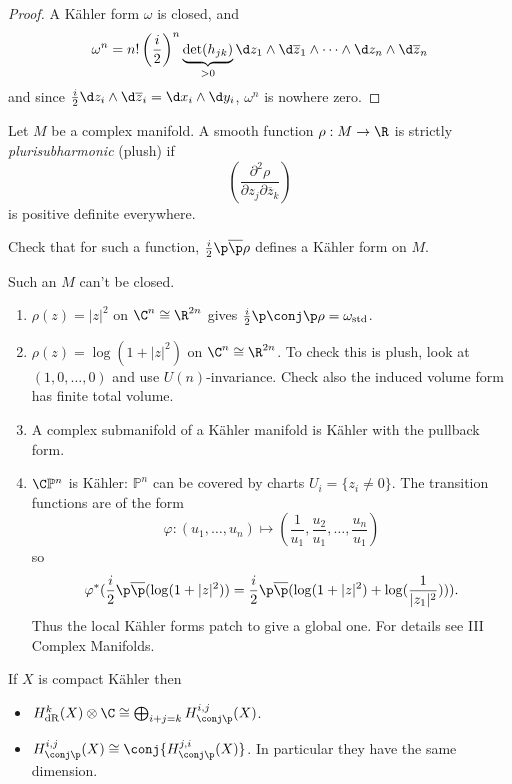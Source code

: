 \documentclass[a4paper]{article}
\renewcommand*{\P}{\mathbb{P}}
\newcommand{\w}{\wedge} %
\begin{document}
\begin{proof}
  A Kähler form \(\omega\) is closed, and
  \[
    \omega^n = n! \left(\frac{i}{2} \right)^n \underbrace{\det(h_{jk})}_{> 0} \d z_1 \w \d \overline z_1 \w \cdots \w \d z_n \w \d \overline z_n
  \]
  and since \(\frac{i}{2} \d z_i \w \d \overline z_i = \d x_i \w \d y_i\), \(\omega^n\) is nowhere zero.
\end{proof}

\begin{definition}[plurisubharmonic]
  Let \(M\) be a complex manifold. A smooth function \(\rho: M \to \R\) is strictly \emph{plurisubharmonic} (plush) if
  \[
    \left( \frac{\partial^2 \rho}{\partial z_j \partial \overline z_k} \right)
  \]
  is positive definite everywhere.
\end{definition}

Check that for such a function, \(\frac{i}{2} \p \overline \p \rho\) defines a Kähler form on \(M\).

\begin{remark}
  Such an \(M\) can't be closed.
\end{remark}

\begin{eg}\leavevmode
  \begin{enumerate}
  \item \(\rho(z) = |z|^2\) on \(\C^n \cong \R^{2n}\) gives \(\frac{i}{2} \p \conj \p \rho = \omega_{\text{std}}\).
  \item \(\rho(z) = \log(1 + |z|^2)\) on \(\C^n \cong \R^{2n}\). To check this is plush, look at \((1, 0, \dots, 0)\) and use \(U(n)\)-invariance. Check also the induced volume form has finite total volume.
  \item A complex submanifold of a Kähler manifold is Kähler with the pullback form.
  \item \(\C \P^n\) is Kähler: \(\P^n\) can be covered by charts \(U_i = \{z_i \ne 0\}\). The transition functions are of the form
    \[
      \varphi: (u_1, \dots, u_n) \mapsto (\frac{1}{u_1}, \frac{u_2}{u_1}, \dots, \frac{u_n}{u_1})
    \]
    so
    \[
      \varphi^*(\frac{i}{2} \p \overline \p(\log(1 + |z|^2))
      = \frac{i}{2} \p \overline \p (\log(1 + |z|^2) + \log (\frac{1}{|z_1|^2}))).
    \]
    Thus the local Kähler forms patch to give a global one. For details see III Complex Manifolds.
  \end{enumerate}
\end{eg}

\begin{theorem}[Hodge]
  If \(X\) is compact Kähler then
  \begin{itemize}
  \item \(H^k_{\mathrm{dR}}(X) \otimes \C \cong \bigoplus_{i + j = k} H^{i, j}_{\conj \p}(X)\).
  \item \(H^{i, j}_{\conj \p}(X) \cong \conj{H^{j, i}_{\conj \p}(X)}\). In particular they have the same dimension.
  \end{itemize}
\end{theorem}
\end{document}
